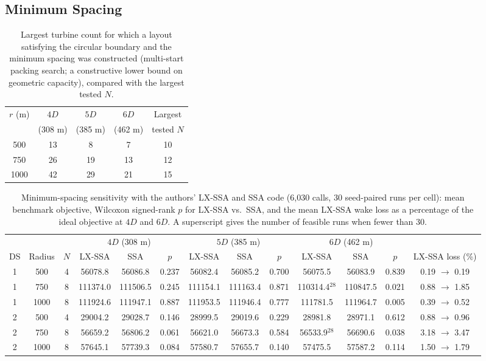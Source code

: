 \documentclass[journal,twoside]{IEEEtran}
\begin{document}
\subsection{Minimum Spacing}
\label{sec:spacing}
\begin{table}[!t]
\centering
\caption{Largest turbine count for which a layout satisfying the circular boundary and the minimum spacing was constructed (multi-start packing search; a constructive lower bound on geometric capacity), compared with the largest tested $N$.}
\label{tab:capacity}
\footnotesize
\begin{tabular}{ccccc}
\toprule
$r$ (m) & $4D$ & $5D$ & $6D$ & Largest \\
 & (308 m) & (385 m) & (462 m) & tested $N$ \\
\midrule
500 & 13 & 8 & 7 & 10 \\
750 & 26 & 19 & 13 & 12 \\
1000 & 42 & 29 & 21 & 15 \\
\bottomrule
\end{tabular}
\end{table}
\begin{table}[!t]
\centering
\caption{Minimum-spacing sensitivity with the authors' LX-SSA and SSA code (6,030 calls, 30 seed-paired runs per cell): mean benchmark objective, Wilcoxon signed-rank $p$ for LX-SSA vs.\ SSA, and the mean LX-SSA wake loss as a percentage of the ideal objective at $4D$ and $6D$. A superscript gives the number of feasible runs when fewer than 30.}
\label{tab:spacing-authors}
\footnotesize\setlength{\tabcolsep}{3pt}
\begin{tabular}{ccccccccccccc}
\toprule
& & & \multicolumn{3}{c}{$4D$ (308 m)} & \multicolumn{3}{c}{$5D$ (385 m)} & \multicolumn{3}{c}{$6D$ (462 m)} & \\
\cmidrule(lr){4-6}\cmidrule(lr){7-9}\cmidrule(lr){10-12}
DS & Radius & $N$ & LX-SSA & SSA & $p$ & LX-SSA & SSA & $p$ & LX-SSA & SSA & $p$ & LX-SSA loss (\%) \\
\midrule
1 & 500 & 4 & 56078.8 & 56086.8 & 0.237 & 56082.4 & 56085.2 & 0.700 & 56075.5 & 56083.9 & 0.839 & 0.19 $\rightarrow$ 0.19 \\
1 & 750 & 8 & 111374.0 & 111506.5 & 0.245 & 111154.1 & 111163.4 & 0.871 & 110314.4$^{28}$ & 110847.5 & 0.021 & 0.88 $\rightarrow$ 1.85 \\
1 & 1000 & 8 & 111924.6 & 111947.1 & 0.887 & 111953.5 & 111946.4 & 0.777 & 111781.5 & 111964.7 & 0.005 & 0.39 $\rightarrow$ 0.52 \\
2 & 500 & 4 & 29004.2 & 29028.7 & 0.146 & 28999.5 & 29019.6 & 0.229 & 28981.8 & 28971.1 & 0.612 & 0.88 $\rightarrow$ 0.96 \\
2 & 750 & 8 & 56659.2 & 56806.2 & 0.061 & 56621.0 & 56673.3 & 0.584 & 56533.9$^{28}$ & 56690.6 & 0.038 & 3.18 $\rightarrow$ 3.47 \\
2 & 1000 & 8 & 57645.1 & 57739.3 & 0.084 & 57580.7 & 57655.7 & 0.140 & 57475.5 & 57587.2 & 0.114 & 1.50 $\rightarrow$ 1.79 \\
\bottomrule
\end{tabular}
\end{table}
\end{document}
